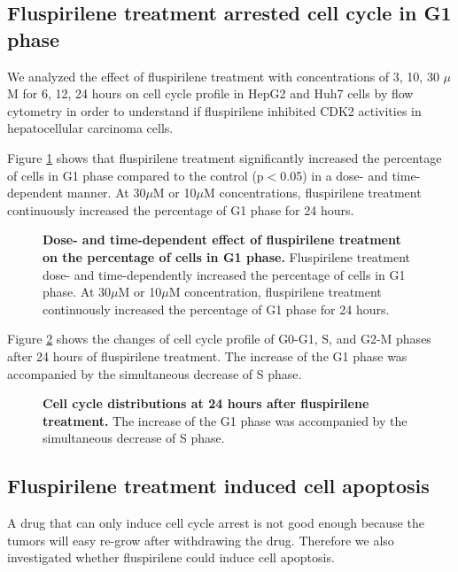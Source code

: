 \documentclass[10pt,letterpaper]{article}
\begin{document}
\subsection*{Fluspirilene treatment arrested cell cycle in G1 phase}

We analyzed the effect of fluspirilene treatment with concentrations of 3, 10, 30 $\mu$M for 6, 12, 24 hours on cell cycle profile in HepG2 and Huh7 cells by flow cytometry in order to understand if fluspirilene inhibited CDK2 activities in hepatocellular carcinoma cells.

Figure \ref{G1Distribution} shows that fluspirilene treatment significantly increased the percentage of cells in G1 phase compared to the control (p$<$0.05) in a dose- and time-dependent manner. At 30$\mu$M or 10$\mu$M concentrations, fluspirilene treatment continuously increased the percentage of G1 phase for 24 hours.

\begin{figure}%
\caption{{\bf Dose- and time-dependent effect of fluspirilene treatment on the percentage of cells in G1 phase.} Fluspirilene treatment dose- and time-dependently increased the percentage of cells in G1 phase. At 30$\mu$M or 10$\mu$M concentration, fluspirilene treatment continuously increased the percentage of G1 phase for 24 hours.}
\label{G1Distribution}
\end{figure}

Figure \ref{CellCycleDistribution} shows the changes of cell cycle profile of G0-G1, S, and G2-M phases after 24 hours of fluspirilene treatment. The increase of the G1 phase was accompanied by the simultaneous decrease of S phase.

\begin{figure}%
\caption{{\bf Cell cycle distributions at 24 hours after fluspirilene treatment.} The increase of the G1 phase was accompanied by the simultaneous decrease of S phase.}
\label{CellCycleDistribution}
\end{figure}

\subsection*{Fluspirilene treatment induced cell apoptosis}

A drug that can only induce cell cycle arrest is not good enough because the tumors will easy re-grow after withdrawing the drug. Therefore we also investigated whether fluspirilene could induce cell apoptosis.
\end{document}
